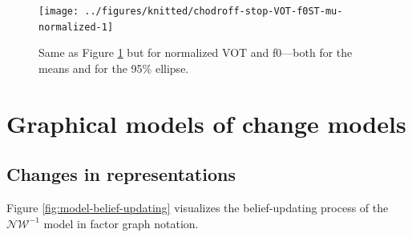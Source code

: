 \documentclass[
  11pt,
  man,floatsintext]{apa6}
\begin{document}
\begin{figure}

{\centering \texttt{[image: ../figures/knitted/chodroff-stop-VOT-f0ST-mu-normalized-1]} 

}

\caption{Same as Figure \ref{fig:chodroff-stop-VOT-f0ST-mu-normalized} but for normalized VOT and f0---both for the means and for the 95\% ellipse.}\label{fig:chodroff-stop-VOT-f0ST-mu-normalized}
\end{figure}

\hypertarget{sec:SI-models}{%
\section{Graphical models of change models}\label{sec:SI-models}}

\hypertarget{sec:SI-models-changes-in-representations}{%
\subsection{Changes in representations}\label{sec:SI-models-changes-in-representations}}

Figure \ref{fig:model-belief-updating} visualizes the belief-updating process of the \(\mathcal{NW^{-1}}\) model in factor graph notation.
\end{document}
